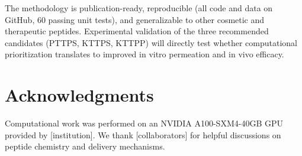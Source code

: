 \documentclass[11pt,a4paper]{article}
\begin{document}
The methodology is publication-ready, reproducible (all code and data on GitHub, 60 passing unit tests), and generalizable to other cosmetic and therapeutic peptides. Experimental validation of the three recommended candidates (PTTPS, KTTPS, KTTPP) will directly test whether computational prioritization translates to improved in vitro permeation and in vivo efficacy.

\section*{Acknowledgments}

Computational work was performed on an NVIDIA A100-SXM4-40GB GPU provided by [institution]. We thank [collaborators] for helpful discussions on peptide chemistry and delivery mechanisms.
\end{document}
